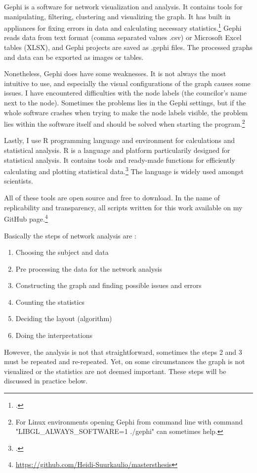 Gephi is a software for network visualization and analysis. It contains tools for manipulating, filtering, clustering and visualizing the graph. It has built in appliances for fixing errors in data and calculating necessary statistics.\footcite{gephi} Gephi reads data from text format (comma separated values .csv) or Microsoft Excel tables (XLSX), and Gephi projects are saved as .gephi files. The processed graphs and data can be exported as images or tables.  

Nonetheless, Gephi does have some weaknesses. It is not always the most intuitive to use, and especially the visual configurations of the graph causes some issues. I have encountered difficulties with the node labels (the councilor's name next to the node). Sometimes the problems lies in the Gephi settings, but if the whole software crashes when trying to make the node labels visible, the problem lies within the software itself and should be solved when starting the program.\footnote{For Linux environments opening Gephi from command line with command "LIBGL\_ALWAYS\_SOFTWARE=1 ./gephi" can sometimes help.} 

Lastly, I use R programming language and environment for calculations and statistical analysis. R is a language and platform particularily designed for statistical analysis. It contains tools and ready-made functions for efficiently calculating and plotting statistical data.\footcite{R} The language is widely used amongst scientists. 

All of these tools are open source and free to download. In the name of replicability and transparency, all scripts written for this work available on my GitHub page.\footnote{\url{https://github.com/Heidi-Suurkaulio/mastersthesis}}

Basically the steps of network analysis are : \begin{enumerate}
	\item Choosing the subject and data
	\item Pre processing the data for the network analysis
	\item Constructing the graph and finding possible issues and errors 
	\item Counting the statistics
	\item Deciding the layout (algorithm)
	\item Doing the interpretations
\end{enumerate}
However, the analysis is not that straightforward, sometimes the steps 2 and 3 must be repeated and re-repeated. Yet, on some circumstances the graph is not visualized or the statistics are not deemed important. These steps will be discussed in practice below.

